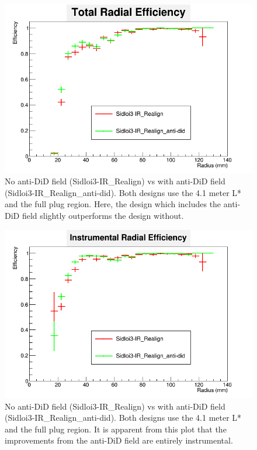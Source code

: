 \documentclass{report}
\begin{document}
                \begin{figure}[H] 
                    \includegraphics[height=.4\textheight]{RadialEfficiency_total_did}
                    \centering
                    \caption{No anti-DiD field (Sidloi3-IR\_Realign) vs with anti-DiD field 
                            (Sidloi3-IR\_Realign\_anti-did). Both designs use the 4.1 meter L*
                            and the full plug region. Here, the design which includes the anti-DiD
                            field slightly outperforms the design without.}
                    \label{fig__did_beamcal_total}
                \end{figure}
                \begin{figure}[H]
                    \includegraphics[height=.4\textheight]{RadialEfficiency_instrumental_did}
                    \centering
                    \caption{No anti-DiD field (Sidloi3-IR\_Realign) vs with anti-DiD field 
                            (Sidloi3-IR\_Realign\_anti-did). Both designs use the 4.1 meter L*
                            and the full plug region. It is apparent from this plot that the
                            improvements from the anti-DiD field are entirely instrumental.}
                    \label{fig__did_beamcal_inst}
                \end{figure}
\end{document}
